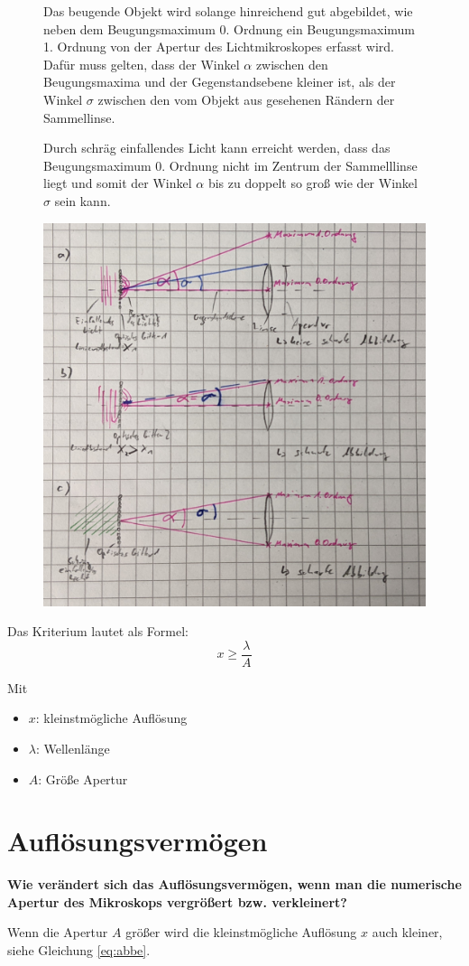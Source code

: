 \documentclass[a4paper, 12pt]{article}
\begin{document}
\begin{figure}[htbp]
\begin{minipage}{0.48\textwidth}
Das beugende Objekt wird solange hinreichend gut abgebildet, wie neben dem Beugungsmaximum 0. Ordnung ein Beugungsmaximum 1. Ordnung von der Apertur des Lichtmikroskopes erfasst wird.
Dafür muss gelten, dass der Winkel $\alpha$ zwischen den Beugungsmaxima und der Gegenstandsebene kleiner ist, als der Winkel $\sigma$ zwischen den vom Objekt aus gesehenen Rändern der Sammellinse.

Durch schräg einfallendes Licht kann erreicht werden, dass das Beugungsmaximum 0. Ordnung nicht im Zentrum der Sammelllinse liegt und somit der Winkel $\alpha$ bis zu doppelt so groß wie der Winkel $\sigma$ sein kann.  

\end{minipage}
\hfill
\begin{minipage}{0.48\textwidth}
	\includegraphics[scale=0.2]{Abbe.png}
\end{minipage}
\end{figure}

Das Kriterium lautet als Formel:
\begin{equation}\label{eq:abbe}
x \geq \frac{\lambda}{A}
\end{equation}

Mit
\begin{itemize}
\item $x$: kleinstmögliche Auflösung
\item $\lambda$: Wellenlänge
\item $A$: Größe Apertur
\end{itemize}

\section{Auflösungsvermögen}
\textbf{Wie verändert sich das Auflösungsvermögen, wenn man die numerische Apertur des Mikroskops vergrößert bzw. verkleinert?}

Wenn die Apertur $A$ größer wird die kleinstmögliche Auflösung $x$ auch kleiner, siehe Gleichung \ref{eq:abbe}.
\end{document}
